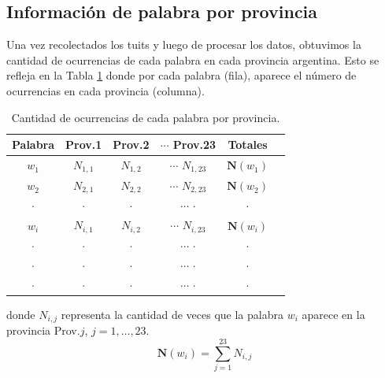 
\newpage
\subsection{Información de palabra por provincia}

Una vez recolectados los tuits y luego de procesar los datos, obtuvimos la cantidad de ocurrencias de cada palabra en cada provincia argentina. Esto se refleja en la Tabla \ref{tab:cantPalabras} donde por cada palabra (fila), aparece el n\'umero de ocurrencias en cada provincia (columna). 

\begin{table}[ht]
\centering
\begin{tabular}{|c|cccc|c|}
  \hline
Palabra &Prov.1& Prov.2 &$\cdots$ Prov.23& Totales \\
  \hline
  $w_1$& $N_{1,1}$& $N_{1,2}$ &$\cdots$
  $N_{1,23}$ & $\mathbf{N}(w_1)$\\
    $w_2$& $N_{2,1}$& $N_{2,2}$&$\cdots$
    $N_{2,23}$ & $\mathbf{N}(w_2)$\\
  $\cdot$& $\cdot$& $\cdot$ &$\cdots$
          $\cdot$ & $\cdot$\\$w_i$& $N_{i,1}$& $N_{i,2}$ &$\cdots$
      $N_{i,23}$ & $\mathbf{N}(w_i)$\\
    $\cdot$& $\cdot$& $\cdot$ &$\cdots$
          $\cdot$ & $\cdot$\\
            $\cdot$& $\cdot$& $\cdot$ &$\cdots$
                    $\cdot$ & $\cdot$\\  $\cdot$& $\cdot$& $\cdot$ &$\cdots$
                              $\cdot$ & $\cdot$\\
      \end{tabular}
      \caption{Cantidad de ocurrencias de cada palabra por provincia.}
      \label{tab:cantPalabras}
\end{table}

\noindent donde $N_{i,j}$ representa la cantidad de veces que la palabra $w_i$ aparece en la provincia Prov.$j$, $j=1,\ldots, 23$. 
\begin{equation}
\mathbf{N}(w_i)=\sum_{j=1}^{23} N_{i,j}
\end{equation}